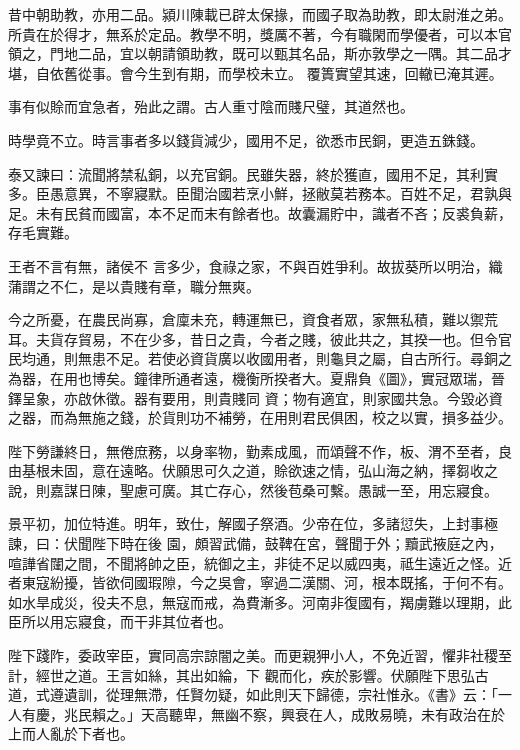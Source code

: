\begin{pinyinscope}
 昔中朝助教，亦用二品。潁川陳載已辟太保掾，而國子取為助教，即太尉淮之弟。所貴在於得才，無系於定品。教學不明，獎厲不著，今有職閑而學優者，可以本官領之，門地二品，宜以朝請領助教，既可以甄其名品，斯亦敦學之一隅。其二品才堪，自依舊從事。會今生到有期，而學校未立。
 覆簣實望其速，回轍已淹其遲。



 事有似賒而宜急者，殆此之謂。古人重寸陰而賤尺璧，其道然也。



 時學竟不立。時言事者多以錢貨減少，國用不足，欲悉市民銅，更造五銖錢。



 泰又諫曰：流聞將禁私銅，以充官銅。民雖失器，終於獲直，國用不足，其利實多。臣愚意異，不寧寢默。臣聞治國若烹小鮮，拯敝莫若務本。百姓不足，君孰與足。未有民貧而國富，本不足而末有餘者也。故囊漏貯中，識者不吝；反裘負薪，存毛實難。



 王者不言有無，諸侯不
 言多少，食祿之家，不與百姓爭利。故拔葵所以明治，織蒲謂之不仁，是以貴賤有章，職分無爽。



 今之所憂，在農民尚寡，倉廩未充，轉運無已，資食者眾，家無私積，難以禦荒耳。夫貨存貿易，不在少多，昔日之貴，今者之賤，彼此共之，其揆一也。但令官民均通，則無患不足。若使必資貨廣以收國用者，則龜貝之屬，自古所行。尋銅之為器，在用也博矣。鐘律所通者遠，機衡所揆者大。夏鼎負《圖》，實冠眾瑞，晉鐸呈象，亦啟休徵。器有要用，則貴賤同
 資；物有適宜，則家國共急。今毀必資之器，而為無施之錢，於貨則功不補勞，在用則君民俱困，校之以實，損多益少。



 陛下勞謙終日，無倦庶務，以身率物，勤素成風，而頌聲不作，板、渭不至者，良由基根未固，意在遠略。伏願思可久之道，賒欲速之情，弘山海之納，擇芻收之說，則嘉謀日陳，聖慮可廣。其亡存心，然後苞桑可繫。愚誠一至，用忘寢食。



 景平初，加位特進。明年，致仕，解國子祭酒。少帝在位，多諸愆失，上封事極諫，曰：伏聞陛下時在後
 園，頗習武備，鼓鞞在宮，聲聞于外；黷武掖庭之內，喧譁省闥之間，不聞將帥之臣，統御之主，非徒不足以威四夷，祗生遠近之怪。近者東寇紛擾，皆欲伺國瑕隙，今之吳會，寧過二漢關、河，根本既搖，于何不有。如水旱成災，役夫不息，無寇而戒，為費漸多。河南非復國有，羯虜難以理期，此臣所以用忘寢食，而干非其位者也。



 陛下踐阼，委政宰臣，實同高宗諒闇之美。而更親狎小人，不免近習，懼非社稷至計，經世之道。王言如絲，其出如綸，下
 觀而化，疾於影響。伏願陛下思弘古道，式遵遺訓，從理無滯，任賢勿疑，如此則天下歸德，宗社惟永。《書》云：「一人有慶，兆民賴之。」天高聽卑，無幽不察，興衰在人，成敗易曉，未有政治在於上而人亂於下者也。




\end{pinyinscope}
